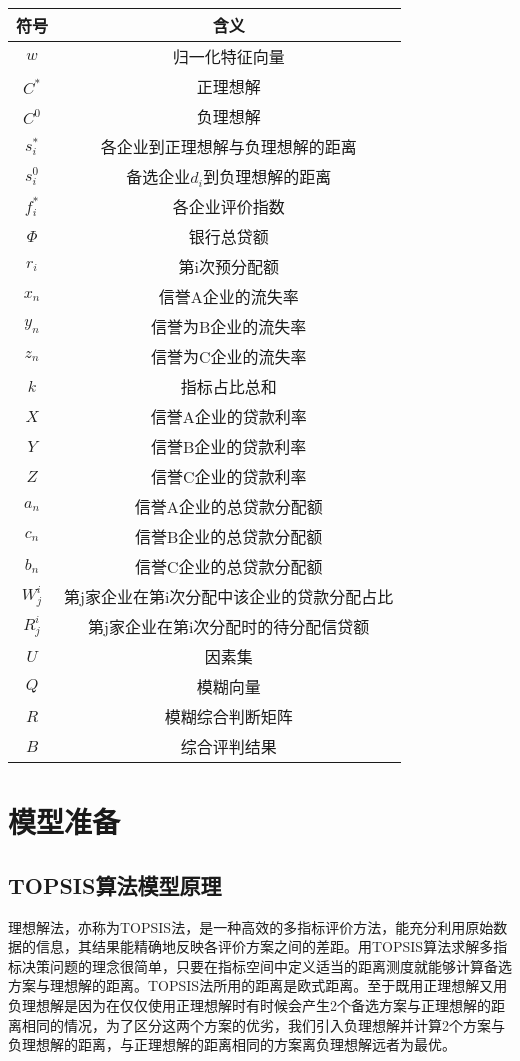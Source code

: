 \documentclass{cumcmthesis}
\begin{document}
\begin{table}[H]   %
	\centering
	\begin{tabular}{cc}
		\toprule[1.5pt]
		符号 & 含义\\
		\midrule[1pt]		
		$w$ & 归一化特征向量\\
		$C^*$ & 正理想解\\
		$C^0$ & 负理想解\\
		$s_i^*$ & 各企业到正理想解与负理想解的距离\\
		$s_i^0$ & 备选企业$d_i$到负理想解的距离\\
		$f_i^*$ & 各企业评价指数\\
		$\Phi$ & 银行总贷额\\
		$r_i$ & 第i次预分配额 \\
		$x_n$ & 信誉A企业的流失率 \\
		$y_n$ & 信誉为B企业的流失率 \\
		$z_n$ & 信誉为C企业的流失率 \\
		$k$ & 指标占比总和 \\
		$X$ & 信誉A企业的贷款利率\\
		$Y$ & 信誉B企业的贷款利率\\
		$Z$ & 信誉C企业的贷款利率\\
		$a_n$ & 信誉A企业的总贷款分配额\\
		$c_n$ &信誉B企业的总贷款分配额\\	
		$b_n$ &信誉C企业的总贷款分配额\\
		$W_j^i$ & 第j家企业在第i次分配中该企业的贷款分配占比\\
		$R_j^i$ & 第j家企业在第i次分配时的待分配信贷额\\
		$U$ & 因素集 \\
		$Q$ & 模糊向量 \\
		$R$ & 模糊综合判断矩阵 \\
		$B$ & 综合评判结果 \\
		
		\bottomrule[1.5pt]
	\end{tabular}
\end{table}

\section{模型准备}
\subsection{TOPSIS算法模型原理}
理想解法，亦称为TOPSIS法，是一种高效的多指标评价方法，能充分利用原始数据的信息，其结果能精确地反映各评价方案之间的差距。用TOPSIS算法求解多指标决策问题的理念很简单，只要在指标空间中定义适当的距离测度就能够计算备选方案与理想解的距离。TOPSIS法所用的距离是欧式距离。至于既用正理想解又用负理想解是因为在仅仅使用正理想解时有时候会产生2个备选方案与正理想解的距离相同的情况，为了区分这两个方案的优劣，我们引入负理想解并计算2个方案与负理想解的距离，与正理想解的距离相同的方案离负理想解远者为最优。
\end{document}
